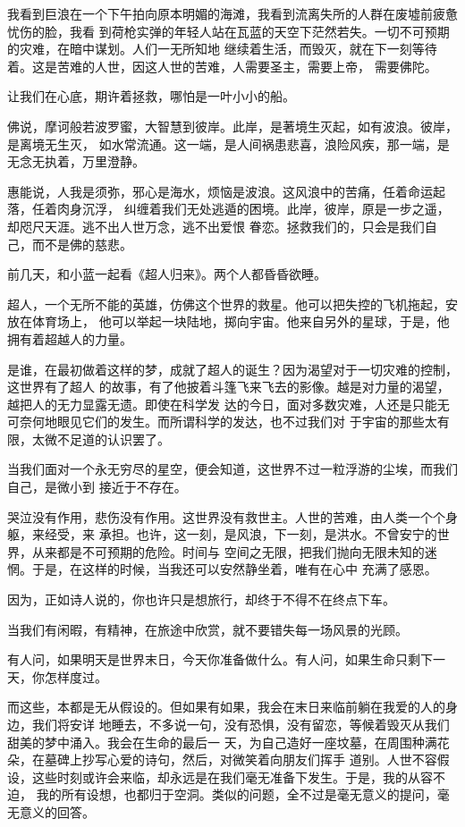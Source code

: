 		我看到巨浪在一个下午拍向原本明媚的海滩，我看到流离失所的人群在废墟前疲惫忧伤的脸，我看
	到荷枪实弹的年轻人站在瓦蓝的天空下茫然若失。一切不可预期的灾难，在暗中谋划。人们一无所知地
	继续着生活，而毁灭，就在下一刻等待着。这是苦难的人世，因这人世的苦难，人需要圣主，需要上帝，
	需要佛陀。


		让我们在心底，期许着拯救，哪怕是一叶小小的船。

		佛说，摩诃般若波罗蜜，大智慧到彼岸。此岸，是著境生灭起，如有波浪。彼岸，是离境无生灭，
	如水常流通。这一端，是人间祸患悲喜，浪险风疾，那一端，是无念无执着，万里澄静。

		惠能说，人我是须弥，邪心是海水，烦恼是波浪。这风浪中的苦痛，任着命运起落，任着肉身沉浮，
	纠缠着我们无处逃遁的困境。此岸，彼岸，原是一步之遥，却咫尺天涯。逃不出人世万念，逃不出爱恨
	眷恋。拯救我们的，只会是我们自己，而不是佛的慈悲。


		前几天，和小蓝一起看《超人归来》。两个人都昏昏欲睡。

		超人，一个无所不能的英雄，仿佛这个世界的救星。他可以把失控的飞机拖起，安放在体育场上，
	他可以举起一块陆地，掷向宇宙。他来自另外的星球，于是，他拥有着超越人的力量。

		是谁，在最初做着这样的梦，成就了超人的诞生？因为渴望对于一切灾难的控制，这世界有了超人
	的故事，有了他披着斗篷飞来飞去的影像。越是对力量的渴望，越把人的无力显露无遗。即使在科学发
	达的今日，面对多数灾难，人还是只能无可奈何地眼见它们的发生。而所谓科学的发达，也不过我们对
	于宇宙的那些太有限，太微不足道的认识罢了。

		当我们面对一个永无穷尽的星空，便会知道，这世界不过一粒浮游的尘埃，而我们自己，是微小到
	接近于不存在。


		哭泣没有作用，悲伤没有作用。这世界没有救世主。人世的苦难，由人类一个个身躯，来经受，来
	承担。也许，这一刻，是风浪，下一刻，是洪水。不曾安宁的世界，从来都是不可预期的危险。时间与
	空间之无限，把我们抛向无限未知的迷惘。于是，在这样的时候，当我还可以安然静坐着，唯有在心中
	充满了感恩。

		因为，正如诗人说的，你也许只是想旅行，却终于不得不在终点下车。

		当我们有闲暇，有精神，在旅途中欣赏，就不要错失每一场风景的光顾。


		有人问，如果明天是世界末日，今天你准备做什么。有人问，如果生命只剩下一天，你怎样度过。

		而这些，本都是无从假设的。但如果有如果，我会在末日来临前躺在我爱的人的身边，我们将安详
	地睡去，不多说一句，没有恐惧，没有留恋，等候着毁灭从我们甜美的梦中涌入。我会在生命的最后一
	天，为自己造好一座坟墓，在周围种满花朵，在墓碑上抄写心爱的诗句，然后，对微笑着向朋友们挥手
	道别。人世不容假设，这些时刻或许会来临，却永远是在我们毫无准备下发生。于是，我的从容不迫，
	我的所有设想，也都归于空洞。类似的问题，全不过是毫无意义的提问，毫无意义的回答。


